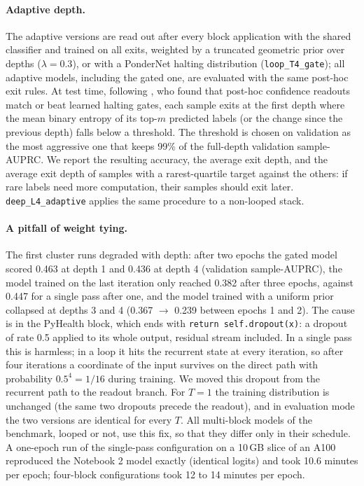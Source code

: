 \documentclass[11pt]{article}
\begin{document}
\paragraph{Adaptive depth.} The adaptive versions are read out after every block application with the shared
classifier and trained on all exits, weighted by a truncated geometric prior over depths ($\lambda=0.3$), or with a
PonderNet halting distribution \citep{banino2021pondernet} (\texttt{loop\_T4\_gate}); all adaptive models,
including the gated one, are evaluated with the same post-hoc exit rules. At test time, following
\citet{popescu2026adaptive}, who found that post-hoc confidence readouts match or beat learned halting gates, each
sample exits at the first depth where the mean binary entropy of its top-$m$ predicted labels (or the change since
the previous depth) falls below a threshold. The threshold is chosen on validation as the most aggressive one that
keeps 99\% of the full-depth validation sample-AUPRC. We report the resulting accuracy, the average exit depth, and
the average exit depth of samples with a rarest-quartile target against the others: if rare labels need more
computation, their samples should exit later. \texttt{deep\_L4\_adaptive} applies the same procedure to a
non-looped stack.

\paragraph{A pitfall of weight tying.} The first cluster runs degraded with depth: after two epochs the gated
model scored 0.463 at depth 1 and 0.436 at depth 4 (validation sample-AUPRC), the model trained on the last
iteration only reached 0.382 after three epochs, against 0.447 for a single pass after one, and the model
trained with a uniform prior collapsed at depths 3 and 4 (0.367 $\rightarrow$ 0.239 between epochs 1 and 2).
The cause is in the PyHealth block, which ends with \texttt{return self.dropout(x)}: a dropout of rate 0.5 applied
to its whole output, residual stream included. In a single pass this is harmless; in a loop it hits the
recurrent state at every iteration, so after four iterations a coordinate of the input survives on the direct
path with probability $0.5^4=1/16$ during training. We moved this dropout from the recurrent path to the
readout branch. For $T=1$ the training distribution is unchanged (the same two dropouts precede the readout),
and in evaluation mode the two versions are identical for every $T$. All multi-block models of the benchmark, looped or not, use this fix, so that they
differ only in their schedule. A one-epoch run of the single-pass configuration on a 10\,GB slice of an A100
reproduced the Notebook 2 model exactly (identical logits) and took 10.6 minutes per epoch; four-block
configurations took 12 to 14 minutes per epoch.
\end{document}
